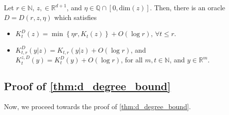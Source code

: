 \documentclass[a4paper,UKenglish,cleveref,autoref,thm-restate]{lipics-v2021}
\renewcommand{\dim}{{\mathrm{dim}}}
\begin{document}
\begin{lemma}\label{lem:oraclebound}
Let $r\in\mathbb{N}$, $z,\in\mathbb{R}^{d+1}$, and
$\eta\in\mathbb{Q}\cap[0,\dim(z)]$. Then, there is an oracle
$D=D(r,z,\eta)$ which satisfies  
\begin{itemize}
\item $K_t^D(z)=\min\left\{\eta r,K_t(z)\right\}+O(\log r)$, $\forall t\leq r$. 
\item $K_{t,r}^D(y|z)=K_{t,r}(y|z)+O(\log r)$, and
  $K_t^{z,D}(y)=K_t^D(y)+O(\log r)$, for all $m,t\in\mathbb{N}$, and
  $y\in\mathbb{R}^m$. 
\end{itemize}
\end{lemma}

\subsection{Proof of \cref{thm:d_degree_bound} }

Now, we proceed towards the proof of \cref{thm:d_degree_bound}.

\end{document}
